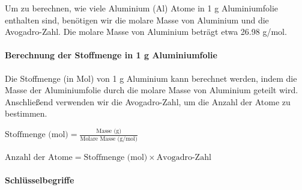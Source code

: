 \documentclass{vorlage-design-main}
\begin{document}
Um zu berechnen, wie viele Aluminium (Al) Atome in 1 g Aluminiumfolie
enthalten sind, benötigen wir die molare Masse von Aluminium und die
Avogadro-Zahl. Die molare Masse von Aluminium beträgt etwa 26.98 g/mol.

\hypertarget{berechnung-der-stoffmenge-in-1-g-aluminiumfolie}{%
\paragraph{Berechnung der Stoffmenge in 1 g
Aluminiumfolie}\label{berechnung-der-stoffmenge-in-1-g-aluminiumfolie}}

Die Stoffmenge (in Mol) von 1 g Aluminium kann berechnet werden, indem
die Masse der Aluminiumfolie durch die molare Masse von Aluminium
geteilt wird. Anschließend verwenden wir die Avogadro-Zahl, um die
Anzahl der Atome zu bestimmen.

$\text{Stoffmenge (mol)} = \frac{\text{Masse (g)}}{\text{Molare Masse (g/mol)}}$

$\text{Anzahl der Atome} = \text{Stoffmenge (mol)} \times \text{Avogadro-Zahl}$

\hypertarget{schluxfcsselbegriffe}{%
\paragraph{Schlüsselbegriffe}\label{schluesselbegriffe}}
\end{document}
